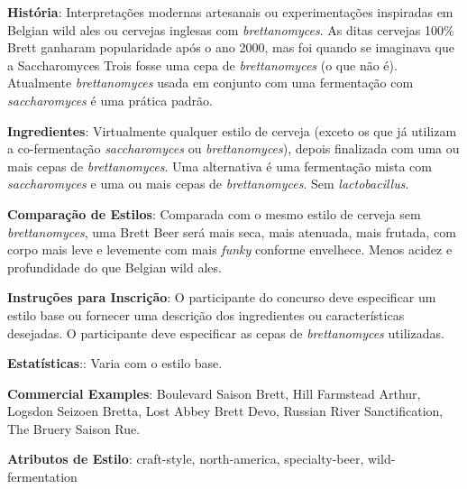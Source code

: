 \textbf{História}: Interpretações modernas artesanais ou experimentações inspiradas em Belgian wild ales ou cervejas inglesas com \textit{brettanomyces}. As ditas cervejas 100\% Brett ganharam popularidade após o ano 2000, mas foi quando se imaginava que a Saccharomyces Trois fosse uma cepa de \textit{brettanomyces} (o que não é). Atualmente \textit{brettanomyces} usada em conjunto com uma fermentação com \textit{saccharomyces} é uma prática padrão.

\textbf{Ingredientes}: Virtualmente qualquer estilo de cerveja (exceto os que já utilizam a co-fermentação \textit{saccharomyces} ou \textit{brettanomyces}), depois finalizada com uma ou mais cepas de \textit{brettanomyces}. Uma alternativa é uma fermentação mista com \textit{saccharomyces} e uma ou mais cepas de \textit{brettanomyces}. Sem \textit{lactobacillus}.

\textbf{Comparação de Estilos}: Comparada com o mesmo estilo de cerveja sem \textit{brettanomyces}, uma Brett Beer será mais seca, mais atenuada, mais frutada, com corpo mais leve e levemente com mais \textit{funky} conforme envelhece. Menos acidez e profundidade do que Belgian wild ales.

\textbf{Instruções para Inscrição}: O participante do concurso deve especificar um estilo base ou fornecer uma descrição dos ingredientes ou características desejadas. O participante deve especificar as cepas de \textit{brettanomyces} utilizadas.

\textbf{Estatísticas}:: Varia com o estilo base.

\textbf{Commercial Examples}: Boulevard Saison Brett, Hill Farmstead Arthur, Logsdon Seizoen Bretta, Lost Abbey Brett Devo, Russian River Sanctification, The Bruery Saison Rue.

\textbf{Atributos de Estilo}: craft-style, north-america, specialty-beer, wild-fermentation

